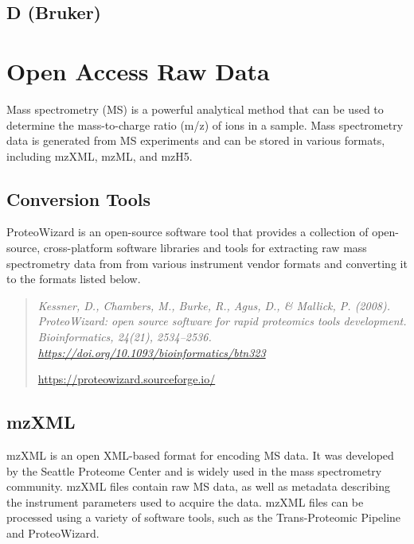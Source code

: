 \documentclass[
]{book}
\begin{document}
\hypertarget{d-bruker}{%
\subsection{D (Bruker)}\label{d-bruker}}

\hypertarget{open-access-raw-data}{%
\section{Open Access Raw Data}\label{open-access-raw-data}}

Mass spectrometry (MS) is a powerful analytical method that can be used to determine the mass-to-charge ratio (m/z) of ions in a sample. Mass spectrometry data is generated from MS experiments and can be stored in various formats, including mzXML, mzML, and mzH5.

\hypertarget{conversion-tools}{%
\subsection*{Conversion Tools}\label{conversion-tools}}

ProteoWizard is an open-source software tool that provides a collection of open-source, cross-platform software libraries and tools for extracting raw mass spectrometry data from from various instrument vendor formats and converting it to the formats listed below.

\begin{quote}
\emph{Kessner, D., Chambers, M., Burke, R., Agus, D., \& Mallick, P. (2008). ProteoWizard: open source software for rapid proteomics tools development. Bioinformatics, 24(21), 2534--2536. \url{https://doi.org/10.1093/bioinformatics/btn323}}

\url{https://proteowizard.sourceforge.io/}
\end{quote}

\hypertarget{mzxml}{%
\subsection*{mzXML}\label{mzxml}}

mzXML is an open XML-based format for encoding MS data. It was developed by the Seattle Proteome Center and is widely used in the mass spectrometry community. mzXML files contain raw MS data, as well as metadata describing the instrument parameters used to acquire the data. mzXML files can be processed using a variety of software tools, such as the Trans-Proteomic Pipeline and ProteoWizard.
\end{document}
